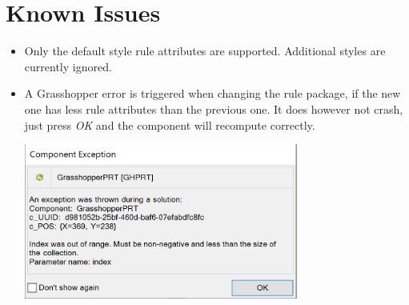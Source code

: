 \section{Known Issues}

\begin{itemize}
    \item Only the default style rule attributes are supported. Additional styles are currently ignored.
    \item A Grasshopper error is triggered when changing the rule package, if the new one has less rule attributes than the previous one. It does however not crash, just press \textit{OK} and the component will recompute correctly.\\
    \begin{minipage}{\linewidth}
        \centering
        \includegraphics[width=9cm]{res/man_gh_error_1.jpg}
    \end{minipage}
\end{itemize}
